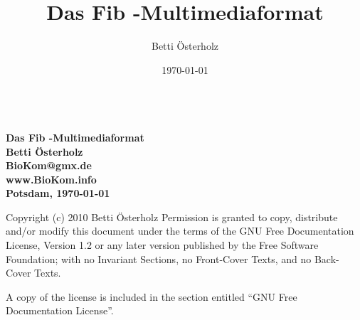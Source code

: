 \documentclass[11pt,a4paper]{article}
\begin{document}
\setlength{\unitlength}{1cm} %

\title{Das Fib -Multimediaformat}
\author{Betti Österholz}
\date{\today}

\begin{titlepage}
	\begin{center}
	\ \vspace{2.5cm} \\
	\Huge\bf Das Fib -Multimediaformat\\\vspace{3cm}
	\LARGE Betti Österholz\\\vspace{0.5cm}
	\large BioKom@gmx.de\\\vspace{0.5cm}
	\large www.BioKom.info\\\vspace{0.5cm}
	Potsdam, \today\\\vspace{5.5cm}
	\end{center}
	
	\noindent
Copyright (c) 2010  Betti Österholz
\newline\newline
Permission is granted to copy, distribute and/or modify this document under the terms of the GNU Free Documentation License, Version 1.2 or any later version published by the Free Software Foundation; with no Invariant Sections, no Front-Cover Texts, and no Back-Cover Texts.

A copy of the license is included in the section entitled "`GNU Free Documentation License"'.
\end{titlepage}

\renewcommand{\sectionmark}[1]{\markboth{#1}{}}
\pagestyle{scrheadings} %
\setheadsepline{0.4pt}
\ihead{} %
\ohead{} %
\chead{\slshape \headmark}  %
\cfoot{\thepage} %


\ihead{\slshape \headmark } %
\ohead{}
\chead{}
\clearpage

\tableofcontents

\clearpage
{}
\end{document}
